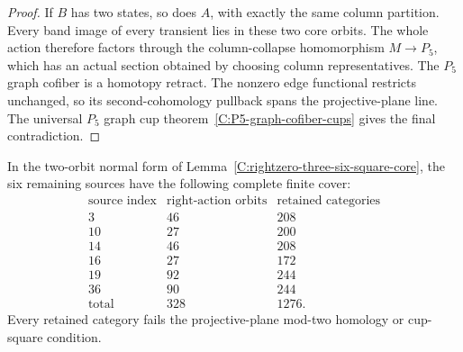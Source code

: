 \begin{proof}
If $B$ has two states, so does $A$, with exactly the same
column partition.  Every band image of every transient lies
in these two core orbits.  The whole action therefore factors
through the column-collapse homomorphism $M\to P_5$, which
has an actual section obtained by choosing column representatives.
The $P_5$ graph cofiber is a homotopy retract.  The nonzero
edge functional restricts unchanged, so its second-cohomology
pullback spans the projective-plane line.  The universal
$P_5$ graph cup theorem~\ref{C:P5-graph-cofiber-cups} gives
the final contradiction.
\end{proof}

\begin{lemma}
\label{C:rightzero-three-six-T2-control}
In the two-orbit normal form of
Lemma~\ref{C:rightzero-three-six-square-core}, the six remaining
sources have the following complete finite cover:
\[
\begin{array}{c|r|r}
\text{source index}&\text{right-action orbits}&
\text{retained categories}\\\hline
3&46&208\\
10&27&200\\
14&46&208\\
16&27&172\\
19&92&244\\
36&90&244\\\hline
\text{total}&328&1276.
\end{array}
\]
Every retained category fails the projective-plane mod-two
homology or cup-square condition.
\end{lemma}
